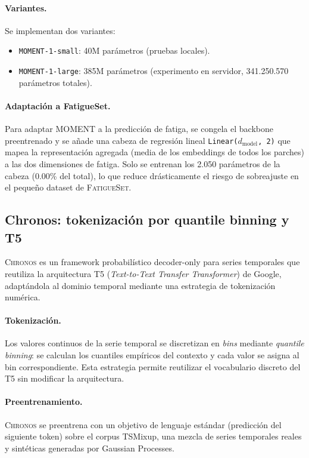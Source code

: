 \documentclass[12pt, a4paper]{article}
\newcommand{\code}[1]{\texttt{#1}}
\newcommand{\fatigueset}{\textsc{FatigueSet}}
\newcommand{\moment}{\textsc{MOMENT}}
\newcommand{\chronos}{\textsc{Chronos}}
\begin{document}
\paragraph{Variantes.} Se implementan dos variantes:
\begin{itemize}
    \item \code{MOMENT-1-small}: 40M parámetros (pruebas locales).
    \item \code{MOMENT-1-large}: 385M parámetros (experimento en servidor, 341.250.570 parámetros totales).
\end{itemize}

\paragraph{Adaptación a FatigueSet.}
Para adaptar \moment{} a la predicción de fatiga, se congela el backbone preentrenado y se añade una cabeza de regresión lineal \code{Linear($d_{\text{model}}$, 2)} que mapea la representación agregada (media de los embeddings de todos los parches) a las dos dimensiones de fatiga. Solo se entrenan los 2.050 parámetros de la cabeza (0.00\% del total), lo que reduce drásticamente el riesgo de sobreajuste en el pequeño dataset de \fatigueset{}.


\subsection{Chronos: tokenización por quantile binning y T5}

\chronos{} \cite{ansari2024chronos} es un framework probabilístico decoder-only para series temporales que reutiliza la arquitectura T5 (\textit{Text-to-Text Transfer Transformer}) de Google, adaptándola al dominio temporal mediante una estrategia de tokenización numérica.

\paragraph{Tokenización.}
Los valores continuos de la serie temporal se discretizan en \textit{bins} mediante \textit{quantile binning}: se calculan los cuantiles empíricos del contexto y cada valor se asigna al bin correspondiente. Esta estrategia permite reutilizar el vocabulario discreto del T5 sin modificar la arquitectura.

\paragraph{Preentrenamiento.}
\chronos{} se preentrena con un objetivo de lenguaje estándar (predicción del siguiente token) sobre el corpus TSMixup, una mezcla de series temporales reales y sintéticas generadas por Gaussian Processes.
\end{document}
